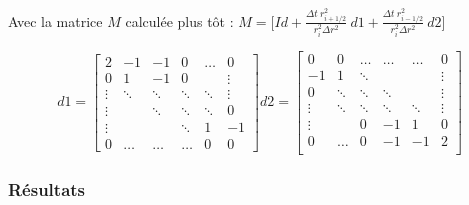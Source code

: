 \documentclass[10pt,a4paper]{article}
\numberwithin{equation}{section}
\begin{document}
Avec la matrice $M$ calculée plus tôt : 
$
M = \Big [ Id + \frac{\Delta t ~ r^2_{i+1/2}}{r^2_i \Delta r^2} ~ d1 + \frac{\Delta t ~ r^2_{i-1/2}}{r^2_i \Delta r^2} ~ d2  \Big]
$

\begin{equation}
d1=
\begin{bmatrix}
    2      & -1     & -1        & 0     &\dots      & 0 \\
    0      &  1     & -1        & 0     &           & \vdots  \\
    \vdots & \ddots & \ddots    &\ddots & \ddots    & \vdots \\
    \vdots &        & \ddots    &\ddots & \ddots    & 0 \\
    \vdots &        &           &\ddots & 1         &  -1 \\
    0      & \dots  & \dots     &\dots  & 0         &  0
\end{bmatrix}
d2=
\begin{bmatrix}
     0     & 0      & \dots  & \dots    &\dots      & 0 \\
    -1     & 1      & \ddots &          &           & \vdots  \\
    0      & \ddots & \ddots & \ddots   &           & \vdots \\
    \vdots & \ddots & \ddots & \ddots   & \ddots    & \vdots \\
    \vdots &        & 0      &  -1      &  1        & 0\\
    0      & \dots  & 0      &  -1      & -1        & 2 \\
\end{bmatrix}
\end{equation}


\subsubsection{Résultats}
\end{document}
